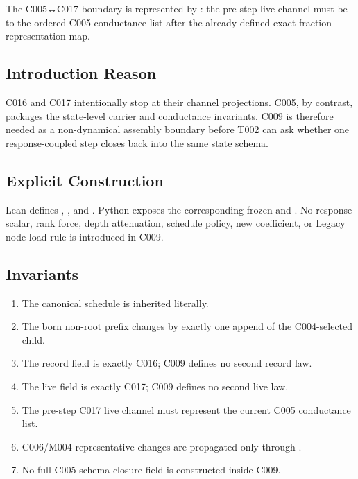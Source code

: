 The C005↔C017 boundary is represented by \texttt{\protect{}}:
the pre-step live channel must be
\texttt{\protect{}} to the ordered C005
conductance list after the already-defined exact-fraction representation
map.

\subsection{Introduction Reason}\label{introduction-reason-29}

C016 and C017 intentionally stop at their channel projections. C005, by
contrast, packages the state-level carrier and conductance invariants.
C009 is therefore needed as a non-dynamical assembly boundary before
T002 can ask whether one response-coupled step closes back into the same
state schema.

\subsection{Explicit Construction}\label{explicit-construction-13}

Lean defines \texttt{\protect{}}, \texttt{\protect{}},
and \texttt{\protect{}}. Python exposes the corresponding frozen
\texttt{\protect{}} and \texttt{\protect{}}.
No response scalar, rank force, depth attenuation, schedule policy, new
coefficient, or Legacy node-load rule is introduced in C009.

\subsection{Invariants}\label{invariants-13}

\begin{enumerate}
\def\labelenumi{\arabic{enumi}.}
\tightlist
\item
  The canonical schedule is inherited literally.
\item
  The born non-root prefix changes by exactly one append of the
  C004-selected child.
\item
  The record field is exactly C016; C009 defines no second record law.
\item
  The live field is exactly C017; C009 defines no second live law.
\item
  The pre-step C017 live channel must represent the current C005
  conductance list.
\item
  C006/M004 representative changes are propagated only through
  \texttt{\protect{}}.
\item
  No full C005 schema-closure field is constructed inside C009.
\end{enumerate}

